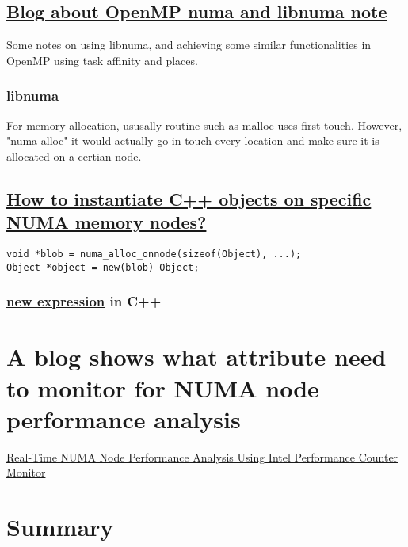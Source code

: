 \documentclass[11pt]{article}
\begin{document}
\subsection{\href{https://yunmingzhang.wordpress.com/2018/01/20/openmp-numa-and-libnuma-note/}{Blog about OpenMP numa and libnuma note}}
\label{sec-7-4}
Some notes on using libnuma, and achieving some similar functionalities in OpenMP using task affinity and places.
\subsubsection{libnuma}
\label{sec-7-4-1}
For memory allocation, ususally routine such as malloc uses first touch. However, "numa alloc" it would actually go in touch every location and make sure it is allocated on a certian node.

\subsection{\href{https://stackoverflow.com/questions/23142702/how-to-instantiate-c-objects-on-specific-numa-memory-nodes}{How to instantiate C++ objects on specific NUMA memory nodes?}}
\label{sec-7-5}
\begin{verbatim}
void *blob = numa_alloc_onnode(sizeof(Object), ...);
Object *object = new(blob) Object;
\end{verbatim}
\subsubsection{\href{http://en.cppreference.com/w/cpp/language/new}{new expression} in C++}
\label{sec-7-5-1}

\section{A blog shows what attribute need to monitor for NUMA node performance analysis}
\label{sec-8}
\href{http://www.acceleware.com/blog/real-time-NUMA-node-performance-analysis-using-intel-performance-counter-monitor}{Real-Time NUMA Node Performance Analysis Using Intel Performance Counter Monitor}
\section{Summary}
\label{sec-9}
\end{document}
